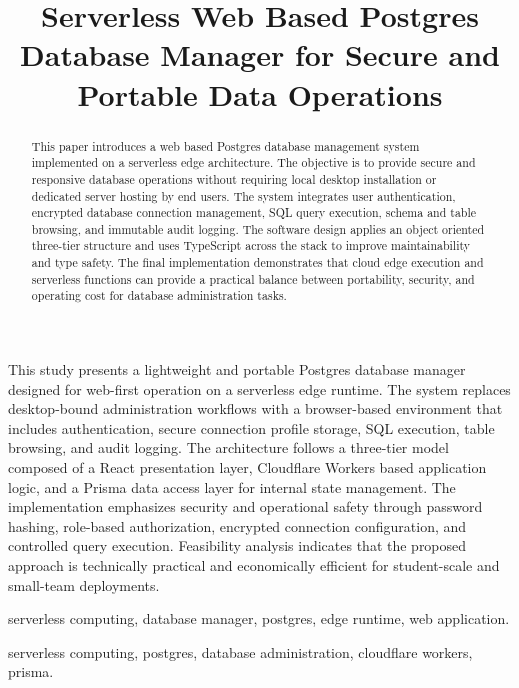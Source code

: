 \documentclass[conference]{IEEEtran}
\begin{document}
\title{Serverless Web Based Postgres Database Manager for Secure and Portable Data Operations}


\author{
}

\maketitle

\begin{ozet}
This study presents a lightweight and portable Postgres database manager designed for web-first operation on a serverless edge runtime. The system replaces desktop-bound administration workflows with a browser-based environment that includes authentication, secure connection profile storage, SQL execution, table browsing, and audit logging. The architecture follows a three-tier model composed of a React presentation layer, Cloudflare Workers based application logic, and a Prisma data access layer for internal state management. The implementation emphasizes security and operational safety through password hashing, role-based authorization, encrypted connection configuration, and controlled query execution. Feasibility analysis indicates that the proposed approach is technically practical and economically efficient for student-scale and small-team deployments.
\end{ozet}
\begin{IEEEanahtar}
serverless computing, database manager, postgres, edge runtime, web application.
\end{IEEEanahtar}

\begin{abstract}
This paper introduces a web based Postgres database management system implemented on a serverless edge architecture. The objective is to provide secure and responsive database operations without requiring local desktop installation or dedicated server hosting by end users. The system integrates user authentication, encrypted database connection management, SQL query execution, schema and table browsing, and immutable audit logging. The software design applies an object oriented three-tier structure and uses TypeScript across the stack to improve maintainability and type safety. The final implementation demonstrates that cloud edge execution and serverless functions can provide a practical balance between portability, security, and operating cost for database administration tasks.
\end{abstract}
\begin{IEEEkeywords}
serverless computing, postgres, database administration, cloudflare workers, prisma.
\end{IEEEkeywords}
\end{document}
